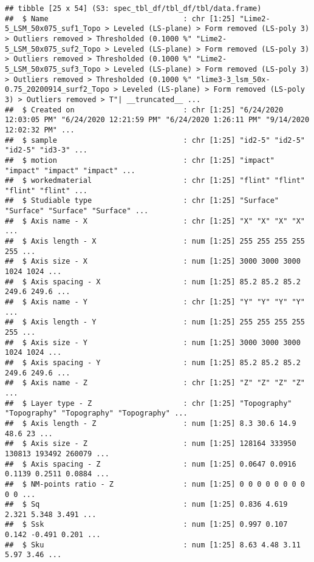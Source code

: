 \documentclass[
]{article}
\begin{document}
\begin{verbatim}
## tibble [25 x 54] (S3: spec_tbl_df/tbl_df/tbl/data.frame)
##  $ Name                               : chr [1:25] "Lime2-5_LSM_50x075_suf1_Topo > Leveled (LS-plane) > Form removed (LS-poly 3) > Outliers removed > Thresholded (0.1000 %" "Lime2-5_LSM_50x075_suf2_Topo > Leveled (LS-plane) > Form removed (LS-poly 3) > Outliers removed > Thresholded (0.1000 %" "Lime2-5_LSM_50x075_suf3_Topo > Leveled (LS-plane) > Form removed (LS-poly 3) > Outliers removed > Thresholded (0.1000 %" "lime3-3_lsm_50x-0.75_20200914_surf2_Topo > Leveled (LS-plane) > Form removed (LS-poly 3) > Outliers removed > T"| __truncated__ ...
##  $ Created on                         : chr [1:25] "6/24/2020 12:03:05 PM" "6/24/2020 12:21:59 PM" "6/24/2020 1:26:11 PM" "9/14/2020 12:02:32 PM" ...
##  $ sample                             : chr [1:25] "id2-5" "id2-5" "id2-5" "id3-3" ...
##  $ motion                             : chr [1:25] "impact" "impact" "impact" "impact" ...
##  $ workedmaterial                     : chr [1:25] "flint" "flint" "flint" "flint" ...
##  $ Studiable type                     : chr [1:25] "Surface" "Surface" "Surface" "Surface" ...
##  $ Axis name - X                      : chr [1:25] "X" "X" "X" "X" ...
##  $ Axis length - X                    : num [1:25] 255 255 255 255 255 ...
##  $ Axis size - X                      : num [1:25] 3000 3000 3000 1024 1024 ...
##  $ Axis spacing - X                   : num [1:25] 85.2 85.2 85.2 249.6 249.6 ...
##  $ Axis name - Y                      : chr [1:25] "Y" "Y" "Y" "Y" ...
##  $ Axis length - Y                    : num [1:25] 255 255 255 255 255 ...
##  $ Axis size - Y                      : num [1:25] 3000 3000 3000 1024 1024 ...
##  $ Axis spacing - Y                   : num [1:25] 85.2 85.2 85.2 249.6 249.6 ...
##  $ Axis name - Z                      : chr [1:25] "Z" "Z" "Z" "Z" ...
##  $ Layer type - Z                     : chr [1:25] "Topography" "Topography" "Topography" "Topography" ...
##  $ Axis length - Z                    : num [1:25] 8.3 30.6 14.9 48.6 23 ...
##  $ Axis size - Z                      : num [1:25] 128164 333950 130813 193492 260079 ...
##  $ Axis spacing - Z                   : num [1:25] 0.0647 0.0916 0.1139 0.2511 0.0884 ...
##  $ NM-points ratio - Z                : num [1:25] 0 0 0 0 0 0 0 0 0 0 ...
##  $ Sq                                 : num [1:25] 0.836 4.619 2.321 5.348 3.491 ...
##  $ Ssk                                : num [1:25] 0.997 0.107 0.142 -0.491 0.201 ...
##  $ Sku                                : num [1:25] 8.63 4.48 3.11 5.97 3.46 ...

\end{verbatim}
\end{document}
